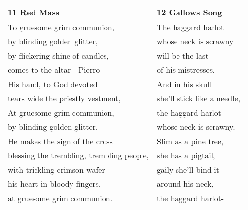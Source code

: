 \begin{table}[h!]
\begin{tabular}{p{8.0cm}|p{8.0cm}}
11 Red Mass& 12 Gallows Song\\\hline
To gruesome grim communion, & The haggard harlot\\
by blinding golden glitter,& whose neck is scrawny\\
by flickering shine of candles,& will be the last\\
comes to the altar - Pierro-& of his mistresses.\\
His hand, to God devoted & And in his skull\\
tears wide the priestly vestment,& she'll stick like a needle,\\
At gruesome grim communion,& the haggard harlot\\
by blinding golden glitter.& whose neck is scrawny.\\
He makes the sign of the cross& Slim as a pine tree,\\
blessing the trembling, trembling people,& she has a pigtail,\\
with trickling crimson wafer:& gaily she'll bind it\\
his heart in bloody fingers,& around his neck,\\
at gruesome grim communion.& the haggard harlot-\\\hline

\end{tabular}
\end{table}

